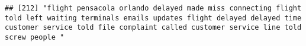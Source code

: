 \documentclass[
]{article}
\begin{document}
\begin{verbatim}
## [212] "flight pensacola orlando delayed made miss connecting flight told left waiting terminals emails updates flight delayed delayed time customer service told file complaint called customer service line told screw people "                                                                                                                                                                                                                                                                                                                                                                                                                                                                                                                                                                                                                                                                                                                                                                                                                                                                                                                                                                                                                                                                                                                                                                                                                                                                                                                                                                                                                                                                                                                                                                      

\end{verbatim}
\end{document}
